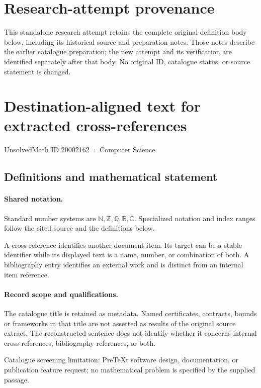 \documentclass[11pt]{article}
\begin{document}
\section*{Research-attempt provenance}
This standalone research attempt retains the complete original definition body below,
including its historical source and preparation notes. Those notes describe the
earlier catalogue preparation; the new attempt and its verification are identified
separately after that body. No original ID, catalogue status, or source statement is changed.

\section{Destination-aligned text for extracted cross-references}\label{20002162}
{\small UnsolvedMath ID 20002162 · Computer Science}
\subsection{Definitions and mathematical statement}

\paragraph{Shared notation.}Standard number systems are $\mathbb N,\mathbb Z,\mathbb Q,\mathbb R,\mathbb C$. Specialized notation and index ranges follow the cited source and the definitions below.


A cross-reference identifies another document item. Its target can be a stable identifier while its displayed text is a name, number, or combination of both. A bibliography entry identifies an external work and is distinct from an internal item reference.
\paragraph{Record scope and qualifications.}
The catalogue title is retained as metadata. Named certificates, contracts, bounds or frameworks in that title are not asserted as results of the original source extract.
The reconstructed sentence does not identify whether it concerns internal cross-references, bibliography references, or both.

Catalogue screening limitation: PreTeXt software design, documentation, or publication feature request; no mathematical problem is specified by the supplied passage.
\end{document}
